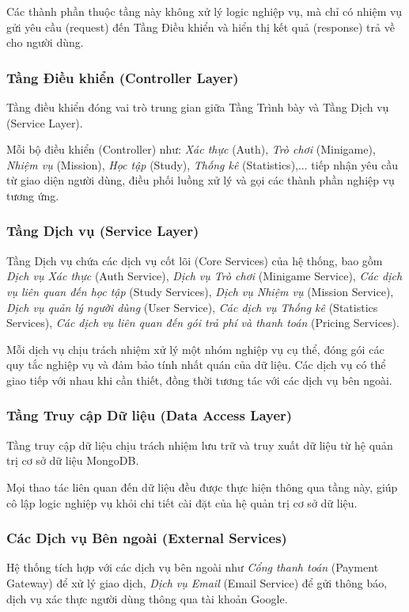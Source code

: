 Các thành phần thuộc tầng này không xử lý logic nghiệp vụ, mà chỉ có nhiệm vụ gửi yêu cầu (request) đến Tầng Điều khiển và hiển thị kết quả (response) trả về cho người dùng.

\subsubsection{Tầng Điều khiển (Controller Layer)}
Tầng điều khiển đóng vai trò trung gian giữa Tầng Trình bày và Tầng Dịch vụ (Service Layer).  

Mỗi bộ điều khiển (Controller) như: \textit{Xác thực} (Auth), \textit{Trò chơi} (Minigame), \textit{Nhiệm vụ} (Mission), \textit{Học tập} (Study), \textit{Thống kê} (Statistics),... tiếp nhận yêu cầu từ giao diện người dùng, điều phối luồng xử lý và gọi các thành phần nghiệp vụ tương ứng.  

\subsubsection{Tầng Dịch vụ (Service Layer)}
Tầng Dịch vụ chứa các dịch vụ cốt lõi (Core Services) của hệ thống, bao gồm \textit{Dịch vụ Xác thực} (Auth Service), \textit{Dịch vụ Trò chơi} (Minigame Service), \textit{Các dịch vụ liên quan đến học tập} (Study Services), \textit{Dịch vụ Nhiệm vụ} (Mission Service), \textit{Dịch vụ quản lý người dùng} (User Service), \textit{Các dịch vụ Thống kê} (Statistics Services), \textit{Các dịch vụ liên quan đến gói trả phí và thanh toán} (Pricing Services).  

Mỗi dịch vụ chịu trách nhiệm xử lý một nhóm nghiệp vụ cụ thể, đóng gói các quy tắc nghiệp vụ và đảm bảo tính nhất quán của dữ liệu.  
Các dịch vụ có thể giao tiếp với nhau khi cần thiết, đồng thời tương tác với các dịch vụ bên ngoài.

\subsubsection{Tầng Truy cập Dữ liệu (Data Access Layer)}
Tầng truy cập dữ liệu chịu trách nhiệm lưu trữ và truy xuất dữ liệu từ hệ quản trị cơ sở dữ liệu MongoDB.  

Mọi thao tác liên quan đến dữ liệu đều được thực hiện thông qua tầng này, giúp cô lập logic nghiệp vụ khỏi chi tiết cài đặt của hệ quản trị cơ sở dữ liệu.

\subsubsection{Các Dịch vụ Bên ngoài (External Services)}
Hệ thống tích hợp với các dịch vụ bên ngoài như \textit{Cổng thanh toán} (Payment Gateway) để xử lý giao dịch, \textit{Dịch vụ Email} (Email Service) để gửi thông báo, dịch vụ xác thực người dùng thông qua tài khoản Google.  

